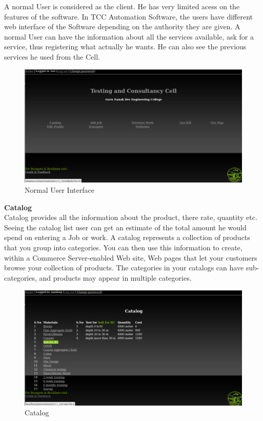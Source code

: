 A normal User is considered as the client. He has very limited acess on the features of the software. In TCC Automation Software, the users have different web interface of the Software depending on the authority they are given. A normal User can have the information about all the services available, ask for a service, thus registering what actually he wants. He can also see the previous services he used from the Cell. 

\begin{figure}[h]
\vskip 2cm
\centering \includegraphics[scale=1.0]{user2.png}
\caption{Normal User Interface}
\end{figure}
\newpage
{\bf Catalog}\\
Catalog provides all the information about the product, there rate, quantity etc. Seeing the catalog list user can get an estimate of the total amount he would spend on entering a Job or work. A catalog represents a collection of products that you group into categories. You can then use this information to create, within a Commerce Server-enabled Web site, Web pages that let your customers browse your collection of products. The categories in your catalogs can have sub-categories, and products may appear in multiple categories.\\


\begin{figure}[h]
\centering \includegraphics[scale=1.0]{Catalog.png}
\caption{Catalog}
\end{figure}\\

